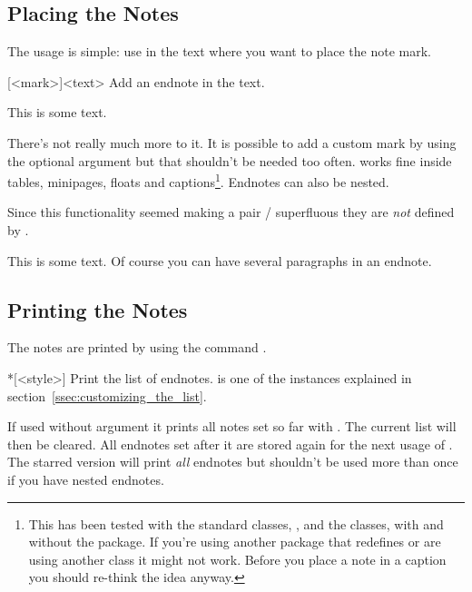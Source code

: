 \documentclass[toc=bib,toc=index]{cnpkgdoc}
\begin{document}
\subsection{Placing the Notes}
The usage is simple: use  in the text where you want to place the
note mark.
\begin{beschreibung}
 [<mark>]{<text>}\newline
   Add an endnote in the text.
\end{beschreibung}
\begin{beispiel}
 This is some text.
\end{beispiel}
There's not really much more to it. It is possible to add a custom mark by
using the optional argument but that shouldn't be needed too often. 
works fine inside tables, minipages, floats and captions\footnote{This has been
tested with the standard classes, , and the 
classes, with and without the  package. If you're using another
package that redefines  or are using another class it might not
work. Before you place a note in a caption you should re-think the idea anyway.}.
Endnotes can also be nested.

Since this functionality seemed making a pair /
superfluous they are \emph{not} defined by \enotez.
\begin{beispiel}
 This is some text.
 Of course you can have several paragraphs\endnote{\kant[1-3]} in an endnote.
\end{beispiel}

\subsection{Printing the Notes}
The notes are printed by using the command .
\begin{beschreibung}
 *[<style>]\newline
   Print the list of endnotes.  is one of the instances explained
   in section~\ref{ssec:customizing_the_list}.
\end{beschreibung}
If used without argument it prints all notes set so far with . The
current list will then be cleared. All endnotes set after it are stored again
for the next usage of . The starred version will print
\emph{all} endnotes but shouldn't be used more than once if you have nested
endnotes.
\end{document}
